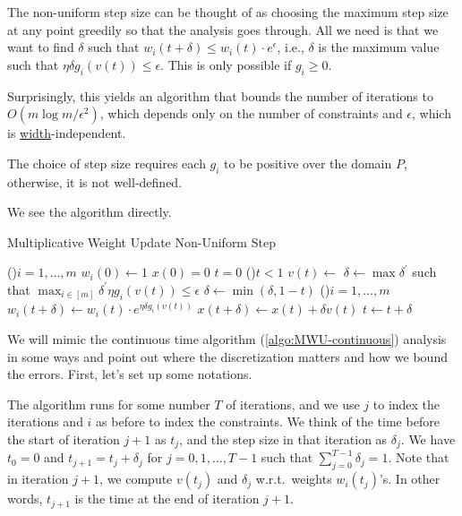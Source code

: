 \begin{intuition}
	The non-uniform step size can be thought of as choosing the maximum step size at any point greedily so that the analysis goes through. All we need is that we want to find \(\delta \) such that \(w_i(t + \delta ) \leq w_i(t) \cdot e^{\epsilon } \), i.e., \(\delta \) is the maximum value such that \(\eta \delta g_i(v(t)) \leq \epsilon \). This is only possible if \(g_i \geq 0\).
\end{intuition}

Surprisingly, this yields an algorithm that bounds the number of iterations to \(O(m \log m / \epsilon ^2)\), which depends only on the number of constraints and \(\epsilon \), which is \hyperref[def:width]{width}-independent.

\begin{note}
	The choice of step size requires each \(g_i\) to be positive over the domain \(P\), otherwise, it is not well-defined.
\end{note}

We see the algorithm directly.

\begin{algorithm}[H]\label{algo:MWU-discrete-non-uniform}
	\DontPrintSemicolon{}
	\caption{Multiplicative Weight Update Non-Uniform Step}
	\BlankLine

	\For(){\(i = 1, \dots , m\)}{
		\(w_i(0) \gets 1\)\;
	}
	\(x(0) = 0\)\;
	\(t = 0\)\;
	\;
	\While(){\(t < 1\)}{
	\(v(t) \gets\)\;
	\(\delta \gets \max \delta ^{\prime} \) such that \(\max _{i \in [m]} \delta ^{\prime} \eta g_i(v(t)) \leq \epsilon \)
	\(\delta \gets \min (\delta , 1 - t)\)
	\For(){\(i = 1, \dots , m\)}{
		\(w_i(t+\delta ) \gets w_i(t) \cdot e^{\eta \delta g_i(v (t))}\)\;
	}
	\(x (t+\delta ) \gets x (t) + \delta v (t)\)\;
	\(t \gets t + \delta \)\;
	}
	\;
\end{algorithm}

We will mimic the continuous time algorithm (\autoref{algo:MWU-continuous}) analysis in some ways and point out where the discretization matters and how we bound the errors. First, let's set up some notations.

\begin{notation}
	The algorithm runs for some number \(T\) of iterations, and we use \(j\) to index the iterations and \(i\) as before to index the constraints. We think of the time before the start of iteration \(j+1\) as \(t_j\), and the step size in that iteration as \(\delta _j\). We have \(t_0 = 0\) and \(t_{j+1} = t_j + \delta _j\) for \(j = 0, 1, \dots , T-1\) such that \(\sum_{j=0}^{T-1} \delta _j = 1\). Note that in iteration \(j+1\), we compute \(v(t_j)\) and \(\delta _j\) w.r.t.\ weights \(w_i(t_j)\)'s. In other words, \(t_{j+1}\) is the time at the end of iteration \(j+1\).
\end{notation}

